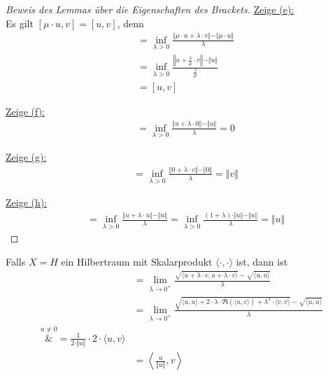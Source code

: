 \begin{proof}[Beweis des Lemmas über die Eigenschaften des Brackets]
\underline{Zeige (e):}\\
Es gilt $[\mu\cdot u,v]=[u,v]$, denn
\begin{align*}
[\mu\cdot u,v]
&=
\inf\limits_{\lambda>0}\frac{\Vert\mu\cdot u+\lambda\cdot v\Vert-\Vert\mu\cdot u\Vert}{\lambda}\\
&=\inf\limits_{\lambda>0}\frac{\left\Vert u+\frac{\lambda}{\mu}\cdot v\right\Vert-\Vert u\Vert}{\frac{\lambda}{\mu}}\\
&=
[u,v]
\end{align*}

\underline{Zeige (f):}
\begin{align*}
[u,0]
&=
\inf\limits_{\lambda>0}\frac{\Vert u+\lambda\cdot0\Vert-\Vert u\Vert}{\lambda}
=0
\end{align*}

\underline{Zeige (g):}
\begin{align*}
[0,v]
&=
\inf\limits_{\lambda>0}\frac{\Vert 0+\lambda\cdot v\Vert-\Vert 0\Vert}{\lambda}
=\Vert v\Vert
\end{align*}

\underline{Zeige (h):}
\begin{align*}
[u,u]
&=
\inf\limits_{\lambda>0}\frac{\Vert u+\lambda\cdot u\Vert-\Vert u\Vert}{\lambda}
=
\inf\limits_{\lambda>0}\frac{(1+\lambda)\cdot\Vert u\Vert-\Vert u\Vert}{\lambda}
=\Vert u\Vert
\end{align*}
\end{proof}

\begin{bemerkung}
Falls $X=H$ ein Hilbertraum mit Skalarprodukt $\langle\cdot,\cdot\rangle$ ist, dann ist
\begin{align*}
[u,v] 
&=
\lim\limits_{\lambda\to0^+}\frac{\sqrt{\langle u+\lambda\cdot v,u+\lambda\cdot v\rangle}-\sqrt{\langle u,u\rangle}}{\lambda}\\
&=\lim\limits_{\lambda\to0^+}\frac{\sqrt{\langle u,u\rangle+2\cdot\lambda\cdot\Re(\langle u,v\rangle)+\lambda^2\cdot\langle v,v\rangle}-\sqrt{\langle u,u\rangle}}{\lambda}\\
\overset{u\neq0}&=
\frac{1}{2\cdot\Vert u\Vert}\cdot 2\cdot\langle u,v\rangle\\
&=\left\langle\frac{u}{\Vert u\Vert},v\right\rangle
\end{align*}
\end{bemerkung}


